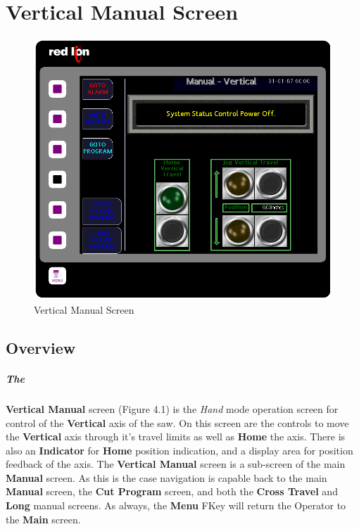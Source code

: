 \chapter{Vertical Manual Screen}
\begin{figure}
	\centering
	\includegraphics[width=0.5\linewidth]{screen-captures/manual/vert-manual}
	\caption{Vertical Manual Screen}
	\label{fig:manual-vertical-screen}
\end{figure}
\section{Overview}\paragraph*{The}\textbf{Vertical Manual} screen (Figure 4.1) is the \textit{Hand} mode operation screen for control of the \textbf{Vertical} axis of the saw. On this screen are the controls to move the \textbf{Vertical} axis through it's travel limits as well as \textbf{Home} the axis. There is also an \textbf{Indicator} for \textbf{Home} position indication, and a display area for position feedback of the axis. The \textbf{Vertical Manual} screen is a sub-screen of the main \textbf{Manual} screen. As this is the case navigation is capable back to the main \textbf{Manual} screen, the \textbf{Cut Program} screen, and both the \textbf{Cross Travel} and \textbf{Long} manual screens. As always, the \textbf{Menu} FKey will return the Operator to the \textbf{Main} screen.
\pagebreak
\nopagebreak
